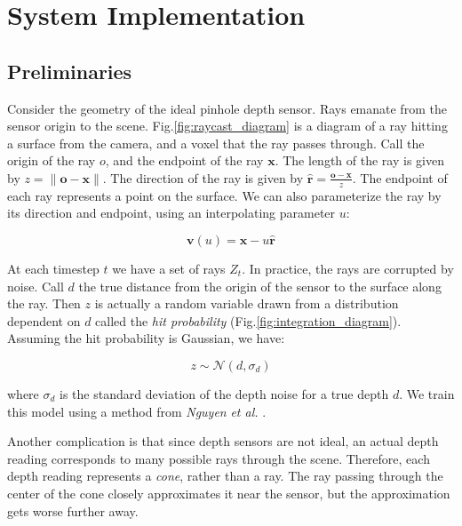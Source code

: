 \documentclass[conference]{IEEEtran}
\newcommand{\figref}[1]{Fig.\ref{#1}}
\newcommand{\etal}{\textit{et al.}\xspace}
\begin{document}
\section{System Implementation} 
\label{section:mapping}
\subsection{Preliminaries}
\label{section:prelim}
Consider the geometry of the ideal pinhole depth sensor. Rays emanate from the
sensor origin to the scene.  \figref{fig:raycast_diagram} is a diagram of a ray hitting a
 surface from the camera, and a voxel that the ray passes through.  Call  the
 origin of the ray $o$, and the endpoint of the ray $\mathbf{x}$.
The length of the ray is given by $z = \|\mathbf{o}
- \mathbf{x}\|$. The direction of the ray is given by $\mathbf{\hat{r}} =
\frac{\mathbf{o} - \mathbf{x}}{z}$. The endpoint of each ray represents a point
on the surface.  We can also parameterize the ray by its direction and
endpoint, using an interpolating parameter $u$:

 \begin{equation}
 	\mathbf{v}(u) = \mathbf{x} - u\mathbf{\hat{r}}
 \end{equation}

At each timestep $t$ we have a set of rays $Z_t$. In practice, the rays are
corrupted by noise. Call $d$ the true distance from the origin of the sensor to
the surface along the ray. Then $z$ is actually a random variable drawn from a
distribution dependent  on $d$ called the \textit{hit probability}
(\figref{fig:integration_diagram}). Assuming the hit probability is Gaussian, we
have:

\begin{equation}
\label{eqn:hitprobability}
z \sim \mathcal{N}(d, \sigma_d)
\end{equation}

\noindent where $\sigma_d$ is the standard deviation of the depth noise for a
true depth $d$. We train this model using a method from \textit{Nguyen} \etal
\cite{Nguyen2012}.

Another complication is that since depth sensors are not ideal, an actual depth
reading corresponds to many possible rays through the scene. Therefore, each
depth reading represents a \textit{cone}, rather than a ray. The ray passing
through the center of the cone closely approximates it near the sensor, but the
approximation gets worse further away.

\end{document}
